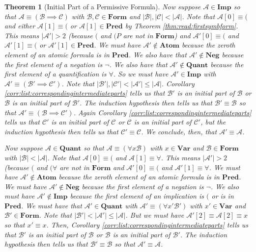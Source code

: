 \documentclass[12pt]{article}
\theoremstyle{break}
\theoremstyle{break}
\newtheorem{theorem}{Theorem}[section]
\theoremstyle{break}
\theoremstyle{break}
\theoremstyle{break}
\newtheorem{informal definition}[definition]{Informal Definition}
\newcommand{\mc}[1]{\mathcal{#1}}
\begin{document}
\begin{theorem}[Initial Part of a Permissive Formula]
Now suppose $\mc{A}\in\textbf{Imp}$ so that $\mc{A}\equiv (\mc{B}\implies \mc{C})$ with $\mc{B}, \mc{C}\in\textbf{Form}$ and $|\mc{B}|, |\mc{C}|<|\mc{A}|$.
Note that $\mc{A}[0]\equiv ($ and either $\mc{A}[1]\equiv ($ or $\mc{A}[1] \in\textbf{Pred}$ by Theorem \ref{thm:read:firstsymbform}.
This means $|\mc{A}'|>2$ (because $($ and $(P$ are not in $\textbf{Form}$) and $\mc{A}'[0] \equiv ($ and $\mc{A}'[1] \equiv ($ or $\mc{A}'[1] \in \textbf{Pred}$.
We must have $\mc{A}'\not\in\textbf{Atom}$ because the zeroth element of an atomic formula is in $\textbf{Pred}$.
We also have that $\mc{A}'\not\in\textbf{Neg}$ because the first element of a negation is $\lnot$.
We also have that $\mc{A}'\not\in\textbf{Quant}$ because the first element of a quantification is $\forall$.
So we must have $\mc{A}'\in\textbf{Imp}$ with $\mc{A}'\equiv (\mc{B}'\implies \mc{C}')$.
Note that $|\mc{B}'|,|\mc{C}'| < |\mc{A}'| \le |\mc{A}|$.
Corollary \ref{corr:list:correspondingintermediateparts} tells us that $\mc{B}'$ is an initial part of $\mc{B}$ or $\mc{B}$ is an initial part of $\mc{B}'$.
The induction hypothesis then tells us that $\mc{B}'\equiv \mc{B}$ so that $\mc{A}'\equiv (\mc{B}\implies \mc{C}')$.
Again Corollary \ref{corr:list:correspondingintermediateparts} tells us that $\mc{C}'$ is an initial part of $\mc{C}$ or $\mc{C}$ is an initial part of $\mc{C}'$, but the induction hypothesis then tells us that $\mc{C}'\equiv \mc{C}$.
We conclude, then, that $\mc{A}'\equiv \mc{A}$.

Now suppose $\mc{A}\in\textbf{Quant}$ so that $\mc{A}\equiv (\forall x \mc{B})$ with $x\in\textbf{Var}$ and $\mc{B}\in\textbf{Form}$ with $|\mc{B}|<|\mc{A}|$.
Note that $\mc{A}[0]\equiv ($ and $\mc{A}[1]\equiv \forall$.
This means $|\mc{A}'|>2$ (because $($ and $(\forall$ are not in $\textbf{Form}$ and $\mc{A}'[0]\equiv ($ and $\mc{A}'[1]\equiv \forall$.
We must have $\mc{A}'\not\in\textbf{Atom}$ because the zeroth element of an atomic formula is in $\textbf{Pred}$.
We must have $\mc{A}'\not\in\textbf{Neg}$ because the first element of a negation is $\lnot$.
We also must have $\mc{A}'\not\in\textbf{Imp}$ because the first element of an implication is $($ or is in $\textbf{Pred}$.
We must have that $\mc{A}'\in\textbf{Quant}$ with $\mc{A}'\equiv (\forall x' \mc{B}')$ with $x'\in\textbf{Var}$ and $\mc{B}'\in\textbf{Form}$.
Note that $|\mc{B}'|<|\mc{A}'| \le |\mc{A}|$.
But we must have $\mc{A}'[2] \equiv \mc{A}[2] \equiv x$ so that $x'\equiv x$.
Then, Corollary \ref{corr:list:correspondingintermediateparts} tells us that $\mc{B}'$ is an initial part of $\mc{B}$ or $\mc{B}$ is an initial part of $\mc{B}'$.
The induction hypothesis then tells us that $\mc{B}'\equiv \mc{B}$ so that $\mc{A}'\equiv \mc{A}$.
\end{theorem}
\end{document}
